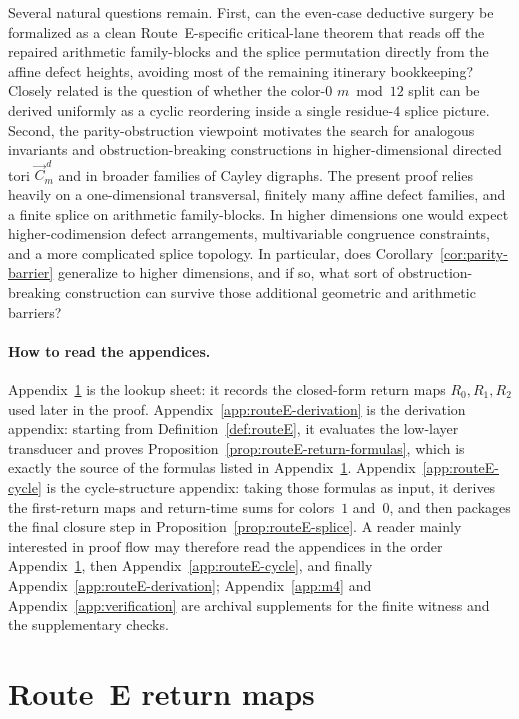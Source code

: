 \documentclass[11pt]{article}
\begin{document}
Several natural questions remain.
First, can the even-case deductive surgery be formalized as a clean Route~E-specific critical-lane theorem that reads off the repaired arithmetic family-blocks and the splice permutation directly from the affine defect heights, avoiding most of the remaining itinerary bookkeeping?
Closely related is the question of whether the color-$0$ $m\bmod 12$ split can be derived uniformly as a cyclic reordering inside a single residue-$4$ splice picture.
Second, the parity-obstruction viewpoint motivates the search for analogous invariants and obstruction-breaking constructions in higher-dimensional directed tori $\vec C_m^{\,d}$ and in broader families of Cayley digraphs.
The present proof relies heavily on a one-dimensional transversal, finitely many affine defect families, and a finite splice on arithmetic family-blocks.
In higher dimensions one would expect higher-codimension defect arrangements, multivariable congruence constraints, and a more complicated splice topology.
In particular, does Corollary~\ref{cor:parity-barrier} generalize to higher dimensions, and if so, what sort of obstruction-breaking construction can survive those additional geometric and arithmetic barriers?

\appendix

\paragraph{How to read the appendices.}
Appendix~\ref{app:routeE} is the lookup sheet: it records the closed-form return maps $R_0,R_1,R_2$ used later in the proof.
Appendix~\ref{app:routeE-derivation} is the derivation appendix: starting from Definition~\ref{def:routeE}, it evaluates the low-layer transducer and proves Proposition~\ref{prop:routeE-return-formulas}, which is exactly the source of the formulas listed in Appendix~\ref{app:routeE}.
Appendix~\ref{app:routeE-cycle} is the cycle-structure appendix: taking those formulas as input, it derives the first-return maps and return-time sums for colors~$1$ and~$0$, and then packages the final closure step in Proposition~\ref{prop:routeE-splice}.
A reader mainly interested in proof flow may therefore read the appendices in the order Appendix~\ref{app:routeE}, then Appendix~\ref{app:routeE-cycle}, and finally Appendix~\ref{app:routeE-derivation}; Appendix~\ref{app:m4} and Appendix~\ref{app:verification} are archival supplements for the finite witness and the supplementary checks.

\section{Route~E return maps}\label{app:routeE}
\end{document}

